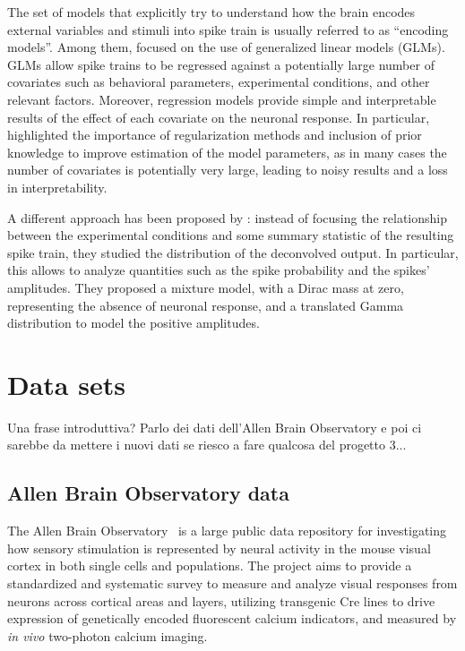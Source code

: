 The set of models that explicitly try to understand how the brain encodes external variables and stimuli into spike train is usually referred to as ``encoding models''. Among them, \citet{paninski2007} focused on the use of generalized linear models (GLMs). GLMs allow spike trains to be regressed against a potentially large number of covariates such as behavioral parameters, experimental conditions, and other relevant factors.
Moreover, regression models provide simple and interpretable results of the effect of each covariate on the neuronal response.
In particular, \citet{paninski2007} highlighted the importance of regularization methods and inclusion of prior knowledge to improve estimation of the model parameters, as in many cases the number of covariates is potentially very large, leading to noisy results and a loss in interpretability.

A different approach has been proposed by \citet{wei2019}: instead of focusing the relationship between the experimental conditions and some summary statistic of the resulting spike train, they studied the distribution of the deconvolved output. In particular, this allows to analyze quantities such as the spike probability and the spikes' amplitudes. They proposed a mixture model, with a Dirac mass at zero, representing the absence of neuronal response, and a translated Gamma distribution to model the positive amplitudes.

\section{Data sets} 
Una frase introduttiva? Parlo dei dati dell'Allen Brain Observatory e poi ci sarebbe da mettere i nuovi dati se riesco a fare qualcosa del progetto 3...

\subsection{Allen Brain Observatory data}
\label{ch1_sec:allen_brain_data}
The Allen Brain Observatory~\citep{allen} is a large public data repository for investigating how sensory stimulation is represented by neural activity in the mouse visual cortex in both single cells and populations.
The project aims to provide a standardized and systematic survey to measure and analyze visual responses from neurons across cortical areas and layers, utilizing transgenic Cre lines to drive expression of genetically encoded fluorescent calcium indicators, and measured by \textit{in vivo} two-photon calcium imaging.

